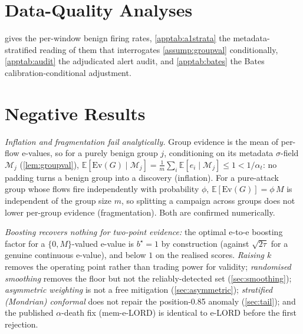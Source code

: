 \documentclass[conference]{IEEEtran}
\newcommand{\ceil}{M}
\newcommand{\alphat}{\alpha_t}
\newcommand{\Ev}{\mathrm{Ev}}
\begin{document}
\section{Data-Quality Analyses}\label{app:quality}
 gives the per-window benign firing rates, \cref{apptab:a1strata} the
metadata-stratified reading of them that interrogates \cref{assump:groupval} conditionally,
\cref{apptab:audit} the adjudicated
alert audit, and \cref{apptab:bates} the Bates calibration-conditional adjustment.









\section{Negative Results}\label{app:negative}

\emph{Inflation and fragmentation fail analytically.} Group evidence is the mean of per-flow
e-values, so for a purely benign group $j$, conditioning on its metadata $\sigma$-field $\mathcal{M}_j$
(\cref{lem:groupval}), $\mathbb{E}[\Ev(G)\mid\mathcal{M}_j]=\frac1m\sum_i\mathbb{E}[e_i\mid\mathcal{M}_j]
\le1<1/\alphat$: no padding turns a benign group into a discovery (inflation). For a pure-attack group whose flows
fire independently with probability $\phi$, $\mathbb{E}[\Ev(G)]=\phi\,\ceil$ is independent of the
group size $m$, so splitting a campaign across groups does not lower per-group evidence
(fragmentation). Both are confirmed numerically.

\emph{Boosting recovers nothing for two-point evidence:} the optimal e-to-e boosting factor for a
$\{0,\ceil\}$-valued e-value is $b^\star=1$ by construction (against $\sqrt{2\tau}$ for a genuine
continuous e-value), and below $1$ on the realised scores. \emph{Raising $k$} removes the operating
point rather than trading power for validity; \emph{randomised smoothing} removes the floor but not
the reliably-detected set (\cref{sec:smoothing}); \emph{asymmetric weighting} is not a free
mitigation (\cref{sec:asymmetric}); \emph{stratified (Mondrian) conformal} does not repair the
position-0.85 anomaly (\cref{sec:tail}); and the published $\alpha$-death fix (mem-e-LORD) is
identical to e-LORD before the first rejection.
\end{document}
